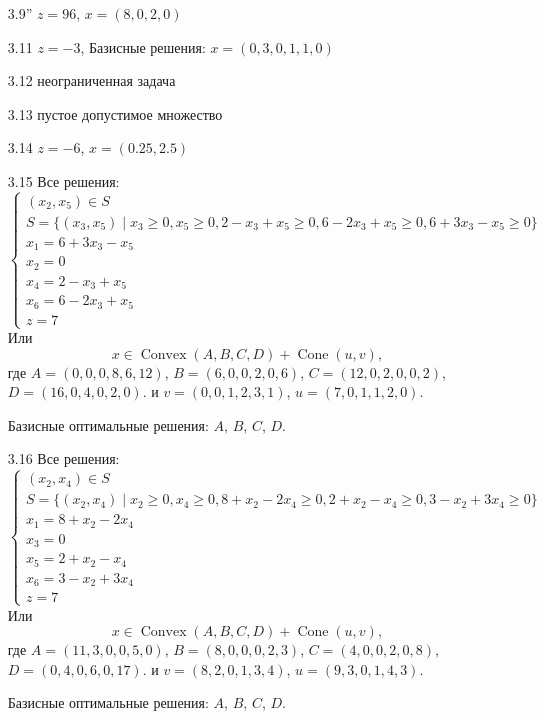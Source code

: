 \documentclass[12pt]{article}
\DeclareMathOperator{\Convex}{Convex}
\DeclareMathOperator{\cone}{Cone}
\begin{document}
\begin{enumerate}
  \item[3.9''] $z = 96$, $x = (8, 0, 2, 0)$
  
  \item[3.11] $z = -3$, Базисные решения: $x = (0, 3, 0, 1, 1, 0)$

  \item[3.12] неограниченная задача
  
  \item[3.13] пустое допустимое множество
  
  \item[3.14] $z=-6$, $x = (0.25, 2.5)$

  \item[3.15] Все решения:
  \[
  \begin{cases}
    (x_2, x_5) \in S\\
    S = \{ (x_3, x_5) \mid x_3 \geq 0, x_5 \geq 0, 2 - x_3 + x_5 \geq 0, 6 - 2x_3 + x_5 \geq 0, 6+3x_3-x_5\geq 0 \} \\
    x_1 = 6 + 3x_3 - x_5\\
    x_2 = 0 \\
    x_4 = 2 - x_3 + x_5 \\ 
    x_6 = 6 - 2x_3 + x_5 \\
    z = 7
  \end{cases} 
  \]
  Или
  \[
  x \in \Convex(A, B, C, D)  + \cone(u, v),
  \]
  где $A = (0, 0, 0, 8, 6, 12)$, $B = (6, 0, 0, 2, 0, 6)$, $C = (12, 0, 2, 0, 0, 2)$, $D = (16, 0, 4, 0, 2, 0)$. 
  и $v = (0, 0, 1, 2, 3, 1)$, $u = (7, 0, 1, 1, 2, 0)$.

  Базисные оптимальные решения: $A$, $B$, $C$, $D$.

  \item[3.16] Все решения:
  \[
  \begin{cases}
    (x_2, x_4) \in S\\
    S = \{ (x_2, x_4) \mid x_2 \geq 0, x_4 \geq 0, 8 + x_2 - 2x_4 \geq 0, 2 + x_2 - x_4 \geq 0, 3 - x_2 + 3x_4 \geq 0 \} \\
    x_1 = 8 + x_2 - 2x_4\\
    x_3 = 0 \\
    x_5 = 2 + x_2 - x_4 \\ 
    x_6 = 3 - x_2 + 3x_4 \\
    z = 7
  \end{cases} 
  \]
  Или
  \[
  x \in \Convex(A, B, C, D)  + \cone(u, v),
  \]
  где $A = (11, 3, 0, 0, 5, 0)$, $B = (8, 0, 0, 0, 2, 3)$, $C = (4, 0, 0, 2, 0, 8)$, $D = (0, 4, 0, 6, 0, 17)$. 
  и $v = (8, 2, 0, 1, 3, 4)$, $u = (9, 3, 0, 1, 4, 3)$.

  Базисные оптимальные решения: $A$, $B$, $C$, $D$.

\end{enumerate}
\end{document}
